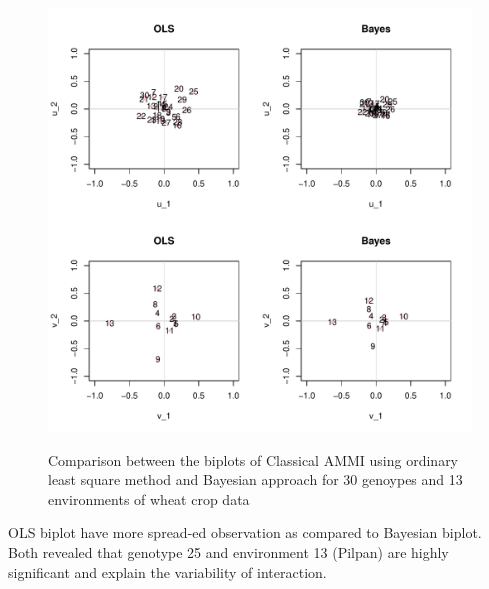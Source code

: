 \begin{figure} [H]
	
	\scalebox{0.32}
	{\includegraphics[width=560mm]{02ThesisMain/Ch04RD/figures/comparison.pdf}}
	\caption[Comparison between OLS and Bayes method]{Comparison between the biplots of Classical AMMI using ordinary least square method and Bayesian approach for 30 genoypes and 13 environments of wheat crop data}
\label{Figure:4.17}
\end{figure}


 OLS biplot have more spread-ed observation as compared to Bayesian biplot. Both revealed that genotype 25 and environment 13 (Pilpan) are highly significant and explain the variability of interaction. 

